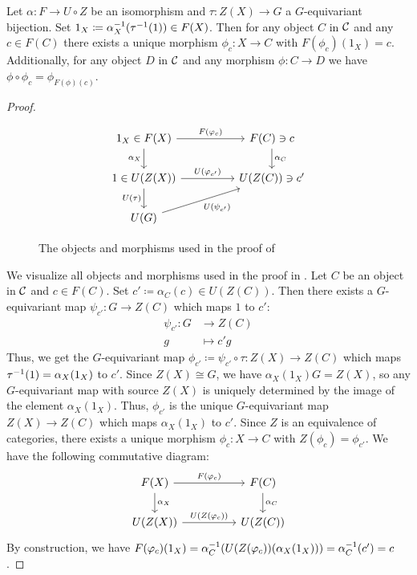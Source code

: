 \begin{lem}\label{lem:free_object}
Let $\alpha\colon F \to U \circ Z$ be an isomorphism and $\tau\colon Z(X) \to G$ a $G$-equivariant bijection. Set $1_X \coloneqq \alpha_X^{-1}(\tau^{-1}(1)) \in F(X)$. Then for any object $C$ in $\mathcal{C}$ and any $c \in F(C)$ there exists a unique morphism $\phi_c\colon X \to C$ with $F(\phi_c)(1_X) = c$. Additionally, for any object $D$ in $\mathcal{C}$ and any morphism $\phi\colon C \to D$ we have $\phi \circ \phi_c = \phi_{F(\phi)(c)}$.
\end{lem}
\begin{proof}
\begin{figure}
\[
\begin{tikzcd}
1_X \in F(X) \arrow[d, "\alpha_X"'] \arrow[rr, "F(\phi_c)"]    &  & F(C) \ni c \arrow[d, "\alpha_C"] \\
1 \in U(Z(X)) \arrow[rr, "U(\phi_{c'})"] \arrow[d, "U(\tau)"'] &  & U(Z(C)) \ni c'                   \\
U(G) \arrow[rru, "U(\psi_{c'})"']                              &  &                                 
\end{tikzcd}
\]
\caption{The objects and morphisms used in the proof of }\label{fig:free_object}
\end{figure}
We visualize all objects and morphisms used in the proof in . Let $C$ be an object in $\mathcal{C}$ and $c \in F(C)$. Set $c' \coloneqq \alpha_C(c) \in U(Z(C))$. Then there exists a $G$-equivariant map $\psi_{c'}\colon G \to Z(C)$ which maps $1$ to $c'$:
\begin{align*}
\psi_{c'}\colon G &\to Z(C)\\
g &\mapsto c'g
\end{align*}
Thus, we get the $G$-equivariant map $\phi_{c'} \coloneqq \psi_{c'} \circ \tau\colon Z(X) \to Z(C)$ which maps $\tau^{-1}(1) = \alpha_X(1_X)$ to $c'$. Since $Z(X) \cong G$, we have $\alpha_X(1_X)G = Z(X)$, so any $G$-equivariant map with source $Z(X)$ is uniquely determined by the image of the element $\alpha_X(1_X)$. Thus, $\phi_{c'}$ is the unique $G$-equivariant map $Z(X) \to Z(C)$ which maps $\alpha_X(1_X)$ to $c'$. Since $Z$ is an equivalence of categories, there exists a unique morphism $\phi_c\colon X \to C$ with $Z(\phi_c) = \phi_{c'}$. We have the following commutative diagram:
\[
\begin{tikzcd}
F(X) \arrow[rr, "F(\phi_c)"] \arrow[d, "\alpha_X"] &  & F(C) \arrow[d, "\alpha_C"] \\
U(Z(X)) \arrow[rr, "U(Z(\phi_c))"]                 &  & U(Z(C))                   
\end{tikzcd}
\]
By construction, we have $F(\varphi_c)(1_X) = \alpha_C^{-1}(U(Z(\varphi_c))(\alpha_X(1_X))) = \alpha_C^{-1}(c') = c$.


\end{proof}
